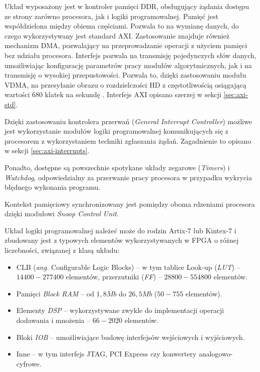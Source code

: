 Układ wyposażony jest w kontroler pamięci DDR, obsługujący żądania dostępu ze strony zarówno procesora, jak i logiki programowalnej. %
Pamięć jest współdzielona między obiema częściami. %
Pozwala to na wymianę danych, do czego wykorzystywany jest standard AXI. Zastosowanie znajduje również mechanizm DMA, pozwalający na przeprowadzanie operacji z użyciem pamięci bez udziału procesora. 
Interfejs pozwala na transmisję pojedynczych słów danych, umożliwiając konfigurację parametrów pracy modułów algorytmicznych, jak i na transmisję o wysokiej przepustowości. 
Pozwala to, dzięki zastosowaniu modułu VDMA, na przesyłanie obrazu o rozdzielczości HD z częstotliwością osiągającą wartości 680 klatek na sekundę  \cite{axi-vdma-guide}. 
Interfejs AXI opisano szerzej w sekcji \ref{sec:axi-std}.

Dzięki zastosowaniu kontrolera przerwań (\emph{General Interrupt Controller}) możliwe jest wykorzystanie modułów logiki programowalnej komunikujących się z procesorem z wykorzystaniem techniki zgłaszania żądań. Zagadnienie to opisano w sekcji \ref{sec:axi-interrupts}.

Ponadto, dostępne są powszechnie spotykane układy zegarowe (\emph{Timers}) i \emph{Watchdog}, odpowiedzialny za przerwanie pracy procesora w przypadku wykrycia błędnego wykonania programu.

Kontekst pamięciowy synchronizowany jest pomiędzy oboma rdzeniami procesora dzięki modułowi \emph{Snoop Control Unit}.

Układ logiki programowalnej należeć może do rodzin Artix-7 lub Kintex-7 i zbudowany jest z typowych elementów wykorzystywanych w FPGA o różnej liczebności, związanej z klasą układu:
\begin{itemize}
	\item CLB (\emph{ang.} Configurable Logic Blocks) -- w tym tablice Look-up (\emph{LUT}) -- $14400 - 277400$ elementów, przerzutniki (\emph{FF}) -- $28800 - 554800$ elementów.
	
	\item Pamięci \emph{Block RAM} -- od $1,8Mb$ do $26,5Mb$ ($50 - 755$ elementów).
	
	\item Elementy \emph{DSP} -- wykorzystywane zwykle do implementacji operacji dodawania i mnożenia -- $66 - 2020$ elementów.
	
	\item Bloki \emph{IOB} -- umożliwiające budowę interfejsów wejściowych i wyjściowych.
	
	\item Inne -- w tym interfejs JTAG, PCI Express czy konwertery analogowo-cyfrowe.
\end{itemize}

